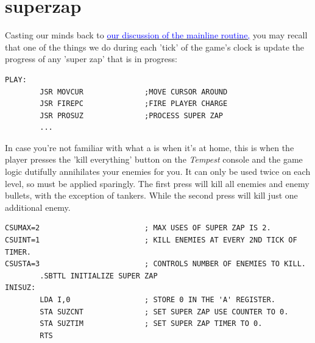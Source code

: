 \chapter{superzap}
\lhead[tempest]{}
\label{sec:if}
\lstset{style=6502Style}

Casting our minds back to 
\hyperref[sec:mainline]{\textcolor{blue}{our discussion of the mainline routine,}} you may recall 
that one of the things we do during each 'tick' of the game's clock is update the progress
of any 'super zap' that is in progress:
\begin{lstlisting}
PLAY:
        JSR MOVCUR              ;MOVE CURSOR AROUND
        JSR FIREPC              ;FIRE PLAYER CHARGE
        JSR PROSUZ              ;PROCESS SUPER ZAP
        ...
\end{lstlisting}

In case you're not familiar with what a  is when it's at home, this is when
the player presses the 'kill everything' button on the \textit{Tempest} console and the game
logic dutifully annihilates your enemies for you. It can only be used twice on each level,
so must be applied sparingly. The first press will kill all enemies and enemy bullets, with the
exception of tankers. While the second press will kill just one additional enemy.

\begin{lstlisting}
CSUMAX=2                        ; MAX USES OF SUPER ZAP IS 2.
CSUINT=1                        ; KILL ENEMIES AT EVERY 2ND TICK OF TIMER.
CSUSTA=3                        ; CONTROLS NUMBER OF ENEMIES TO KILL. 
        .SBTTL INITIALIZE SUPER ZAP
INISUZ:
        LDA I,0                 ; STORE 0 IN THE 'A' REGISTER.
        STA SUZCNT              ; SET SUPER ZAP USE COUNTER TO 0.
        STA SUZTIM              ; SET SUPER ZAP TIMER TO 0.
        RTS
\end{lstlisting}

